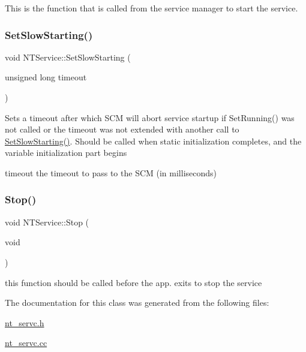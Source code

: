 This is the function that is called from the service manager to start the service. \mbox{\label{classNTService_a5a2e4a86c43e059e2d7e0f5b28bb0d48}} 
\subsubsection{\texorpdfstring{Set\+Slow\+Starting()}{SetSlowStarting()}}
{\footnotesize\ttfamily void N\+T\+Service\+::\+Set\+Slow\+Starting (\begin{DoxyParamCaption}\item[{unsigned long}]{timeout }\end{DoxyParamCaption})}

Sets a timeout after which S\+CM will abort service startup if Set\+Running() was not called or the timeout was not extended with another call to \mbox{\hyperlink{classNTService_a5a2e4a86c43e059e2d7e0f5b28bb0d48}{Set\+Slow\+Starting()}}. Should be called when static initialization completes, and the variable initialization part begins

\begin{DoxyItemize}
\item timeout the timeout to pass to the S\+CM (in milliseconds) \end{DoxyItemize}
\mbox{\label{classNTService_a58cffe68293f4919153cf798517d94f2}} 
\subsubsection{\texorpdfstring{Stop()}{Stop()}}
{\footnotesize\ttfamily void N\+T\+Service\+::\+Stop (\begin{DoxyParamCaption}\item[{void}]{ }\end{DoxyParamCaption})}

this function should be called before the app. exits to stop the service 

The documentation for this class was generated from the following files\+:\begin{DoxyCompactItemize}
\item 
\mbox{\hyperlink{nt__servc_8h}{nt\+\_\+servc.\+h}}\item 
\mbox{\hyperlink{nt__servc_8cc}{nt\+\_\+servc.\+cc}}\end{DoxyCompactItemize}
